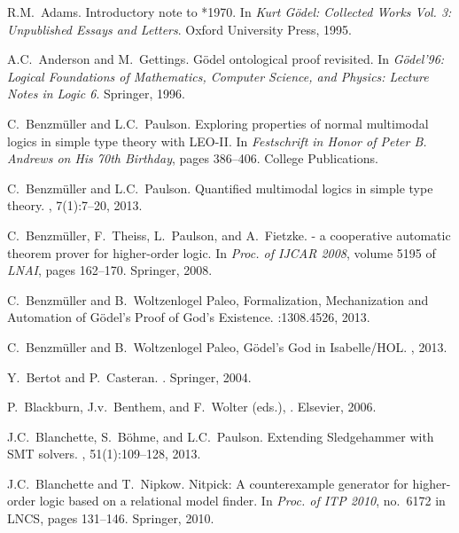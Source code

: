 \documentclass{llncs}
\begin{document}

%
\begin{thebibliography}{10}

R.M.~Adams.
\newblock Introductory note to *1970.
\newblock In {\em {Kurt G\"odel: Collected Works Vol. 3: Unpublished Essays and
  Letters}}. Oxford University Press, 1995.

A.C.~Anderson and M.~Gettings.
\newblock G\"odel ontological proof revisited.
\newblock In {\em {G\"odel'96: Logical Foundations of Mathematics, Computer
  Science, and Physics: Lecture Notes in Logic 6}}. {Springer}, 1996.

C.~Benzm{\"u}ller and L.C.~Paulson.
\newblock Exploring properties of normal multimodal logics in simple type
  theory with {LEO-II}.
\newblock In {\em {Festschrift in Honor of {Peter B. Andrews} on His 70th
  Birthday}}, pages 386--406. College Publications.

C.~Benzm{\"u}ller and L.C.~Paulson.
\newblock Quantified multimodal logics in simple type theory.
,
  7(1):7--20, 2013.

C.~Benzm{\"u}ller, F.~Theiss, L.~Paulson, and A.~Fietzke.
 - a cooperative automatic theorem prover for higher-order
  logic.
\newblock In {\em Proc. of IJCAR 2008}, volume 5195 of {\em LNAI}, pages
  162--170. Springer, 2008.

C.~Benzm{\"u}ller and B.~Woltzenlogel Paleo,
\newblock Formalization, Mechanization and Automation of G{\"o}del's Proof of God's Existence.
:1308.4526, 2013.

C.~Benzm{\"u}ller and B.~Woltzenlogel Paleo,
\newblock G{\"o}del's God in Isabelle/HOL. 
, 2013.

Y.~Bertot and P.~Casteran.
.
\newblock Springer, 2004.

P.~Blackburn, J.v.~Benthem, and F.~Wolter (eds.), . Elsevier, 2006.

J.C.~Blanchette, S.~B\"ohme, and L.C.~Paulson.
\newblock Extending {Sledgehammer} with {SMT} solvers.
, 51(1):109--128, 2013.

J.C.~Blanchette and T.~Nipkow.
\newblock Nitpick: A counterexample generator for higher-order logic based on a
  relational model finder.
\newblock In {\em Proc. of ITP 2010}, no.~6172 in LNCS, pages 131--146.
  Springer, 2010.


\end{thebibliography}
\end{document}
